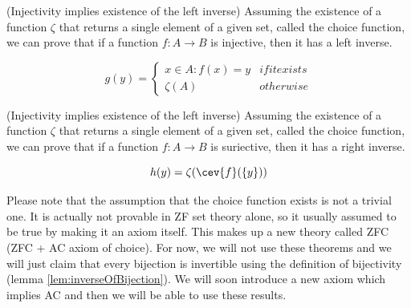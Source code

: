 \begin{lemma}(Injectivity implies existence of the left inverse)
\label{lem:injectiveInverse}
Assuming the existence of a function $\zeta$ that returns a single element of a given set, called the choice function, we can prove 
that if a function $f : A \rightarrow B$ is injective, then it has a left inverse.

\begin{equation*}
    g(y) =
    \begin{cases*}
        x \in A : f(x) = y & if it exists \\
        \zeta(A)           & otherwise
    \end{cases*}
\end{equation*}
\end{lemma}
    


\begin{lemma}(Injectivity implies existence of the left inverse)
\label{lem:suriectiveInverse}
Assuming the existence of a function $\zeta$ that returns a single element of a given set, called the choice function, we can prove 
that if a function $f : A \rightarrow B$ is suriective, then it has a right inverse.

\begin{equation*}
    h(y) = \zeta(\cev{f}(\{y\}))
\end{equation*}
\end{lemma}
     
Please note that the assumption that the choice function exists is not a trivial one. It is actually not 
provable in ZF set theory alone, so it usually assumed to be true by making it an axiom itself. This makes 
up a new theory called ZFC (ZFC + AC axiom of choice). For now, we will not use these theorems and we will just 
claim that every bijection is invertible using the definition of bijectivity (lemma \ref{lem:inverseOfBijection}). We will soon 
introduce a new axiom which implies AC and then we will be able to use these results. \\